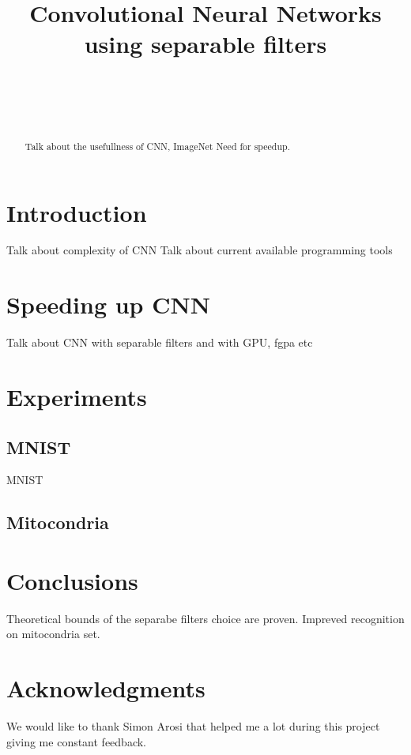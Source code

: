 \documentclass{article} %
\title{Convolutional Neural Networks using separable filters}
\author{
\fontsize{8}{8}\sele
\fontsize{8}{8}\selectfont{Petrescu Viviana}\\
\fontsize{8}{8}\selectfont{EPFL} \\
\fontsize{8}{8}\selectfont{\texttt{viviana.petrescu@epfl.ch}} \\
}
\begin{document}
\maketitle

\begin{abstract}
Talk about the usefullness of CNN, ImageNet Need for speedup.
\end{abstract}

\section{Introduction}
Talk about complexity of CNN
Talk about current available programming tools

\section{Speeding up CNN}
Talk about CNN with separable filters and with GPU, fgpa etc

\section{Experiments}
\subsection{MNIST}
MNIST 
\subsection{Mitocondria}

\section{Conclusions}
Theoretical bounds of the separabe filters choice are proven.
Impreved recognition on mitocondria set.

\section*{Acknowledgments}
We would like to thank Simon Arosi that helped me a lot during this project giving me constant feedback.



\end{document}
